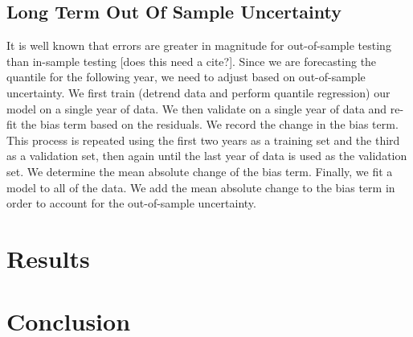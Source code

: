 \documentclass{article}
\begin{document}
\subsection{Long Term Out Of Sample Uncertainty}

It is well known that errors are greater in magnitude for out-of-sample testing than in-sample testing [does this need a cite?]. Since we are forecasting the quantile for the following year, we need to adjust based on out-of-sample uncertainty. We first train (detrend data and perform quantile regression) our model on a single year of data. We then validate on a single year of data and re-fit the bias term based on the residuals. We record the change in the bias term. This process is repeated using the first two years as a training set and the third as a validation set, then again until the last year of data is used as the validation set. We determine the mean absolute change of the bias term. Finally, we fit a model to all of the data. We add the mean absolute change to the bias term in order to account for the out-of-sample uncertainty.

\section{Results}




\section{Conclusion}






\end{document}
